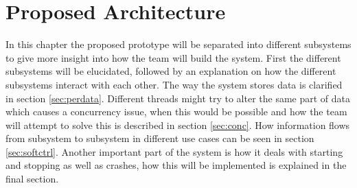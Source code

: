 \chapter{Proposed Architecture}
In this chapter the proposed prototype will be separated into different subsystems to give more insight into how the team will build the system. First the different subsystems will be elucidated, followed by an explanation on how the different subsystems interact with each other. The way the system stores data is clarified in section \ref{sec:perdata}. Different threads might try to alter the same part of data which causes a concurrency issue, when this would be possible and how the team will attempt to solve this is described in section \ref{sec:conc}. How information flows from subsystem to subsystem in different use cases can be seen in section \ref{sec:softctrl}. Another important part of the system is how it deals with starting and stopping as well as crashes, how this will be implemented is explained in the final section.
